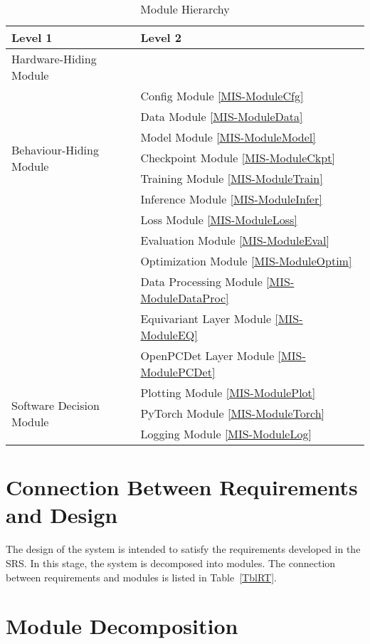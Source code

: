 \documentclass[12pt, titlepage]{article}
\begin{document}
\begin{table}[h!]
\centering
\begin{tabular}{p{} p{}}
\toprule
\textbf{Level 1} & \textbf{Level 2}\\
\midrule

{Hardware-Hiding Module} & ~ \\
\midrule

\multirow{7}{0.3\textwidth}{Behaviour-Hiding Module} 
& Config Module \ref{MIS-ModuleCfg}\\
& Data Module \ref{MIS-ModuleData}\\
& Model Module \ref{MIS-ModuleModel}\\
& Checkpoint Module \ref{MIS-ModuleCkpt}\\
& Training Module \ref{MIS-ModuleTrain}\\
& Inference Module \ref{MIS-ModuleInfer}\\
& Loss Module \ref{MIS-ModuleLoss}\\ 
& Evaluation Module \ref{MIS-ModuleEval}\\
& Optimization Module \ref{MIS-ModuleOptim}\\
& Data Processing Module \ref{MIS-ModuleDataProc}\\
& Equivariant Layer Module \ref{MIS-ModuleEQ}\\
& OpenPCDet Layer Module \ref{MIS-ModulePCDet}\\
\midrule

\multirow{3}{0.3\textwidth}{Software Decision Module}
& Plotting Module \ref{MIS-ModulePlot}\\
& PyTorch Module \ref{MIS-ModuleTorch}\\
& Logging Module \ref{MIS-ModuleLog}\\
\bottomrule

\end{tabular}
\caption{Module Hierarchy}
\label{TblMH}
\end{table}

\section{Connection Between Requirements and Design} \label{SecConnection}

The design of the system is intended to satisfy the requirements developed in
the SRS. In this stage, the system is decomposed into modules. The connection
between requirements and modules is listed in Table~\ref{TblRT}.

\section{Module Decomposition} \label{SecMD}
\end{document}
